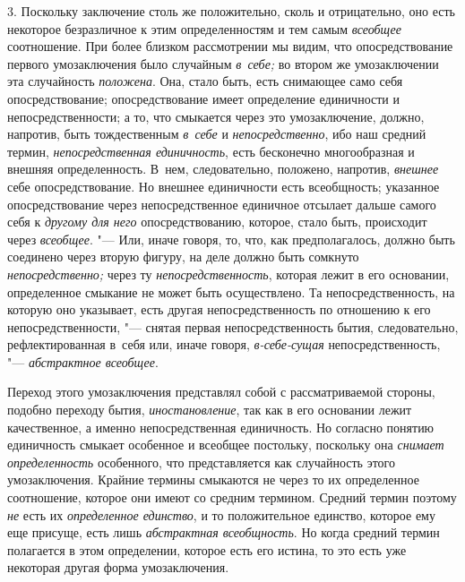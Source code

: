 3. Поскольку заключение столь же положительно, сколь и
отрицательно, оно есть некоторое безразличное к этим определенностям и тем
самым {\em всеобщее} соотношение. При более близком рассмотрении мы видим, что
опосредствование первого умозаключения было случайным {\em в~себе;} во втором
же умозаключении эта случайность {\em положена}. Она,
стало быть, есть снимающее само себя опосредствование; опосредствование
имеет определение единичности и непосредственности; а то, что смыкается
через это умозаключение, должно, напротив, быть тождественным
{\em в~себе} и {\em непосредственно}, ибо наш средний термин,
{\em непосредственная единичность},
есть бесконечно многообразная и внешняя определенность.
В~нем, следовательно, положено, напротив, {\em внешнее} себе
опосредствование. Но внешнее единичности есть всеобщность; указанное
опосредствование через непосредственное единичное отсылает дальше самого
себя к {\em другому для него}
опосредствованию, которое, стало быть, происходит через
{\em всеобщее}. "--- Или,
иначе говоря, то, что, как предполагалось, должно быть соединено через
вторую фигуру, на деле должно быть сомкнуто {\em непосредственно;}
через ту {\em непосредственность},
которая лежит в его основании, определенное смыкание не может
быть осуществлено. Та непосредственность, на которую оно указывает, есть
другая непосредственность по отношению к его непосредственности, "---
снятая первая непосредственность бытия, следовательно,
рефлектированная в~себя или, иначе говоря,
{\em в-себе-сущая}
непосредственность, "---
{\em абстрактное всеобщее}.

Переход этого умозаключения представлял собой с
рассматриваемой стороны, подобно переходу бытия, {\em иностановление},
так как в его основании лежит качественное, а именно
непосредственная единичность. Но согласно понятию единичность смыкает
особенное и всеобщее постольку, поскольку она
{\em снимает определенность}
особенного, что представляется как случайность этого
умозаключения. Крайние термины смыкаются не через то их определенное
соотношение, которое они имеют со средним термином. Средний термин поэтому
{\em не} есть их
{\em определенное единство},
и то положительное единство, которое ему еще присуще, есть
лишь {\em абстрактная всеобщность}.
Но когда средний термин полагается в этом определении,
которое есть его истина, то это есть уже некоторая другая форма
умозаключения.

